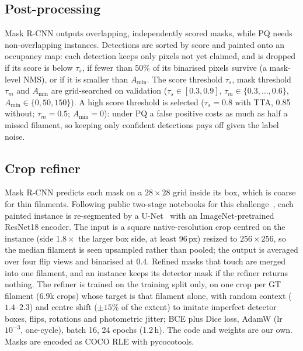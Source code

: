 \subsection{Post-processing}
Mask R-CNN outputs overlapping, independently scored masks, while PQ needs non-overlapping
instances. Detections are sorted by score and painted onto an occupancy map: each detection keeps
only pixels not yet claimed, and is dropped if its score is below $\tau_s$, if fewer than 50\% of
its binarised pixels survive (a mask-level NMS), or if it is smaller than $A_{\min}$. The score
threshold $\tau_s$, mask threshold $\tau_m$ and $A_{\min}$ are grid-searched on validation
($\tau_s\in[0.3,0.9]$, $\tau_m\in\{0.3,\dots,0.6\}$, $A_{\min}\in\{0,50,150\}$). A high score
threshold is selected ($\tau_s=0.8$ with TTA, 0.85 without; $\tau_m=0.5$; $A_{\min}=0$): under PQ a
false positive costs as much as half a missed filament, so keeping only confident detections pays
off given the label noise.

\subsection{Crop refiner}
Mask R-CNN predicts each mask on a $28\times28$ grid inside its box, which is coarse for thin
filaments. Following public two-stage notebooks for this challenge~\cite{refinernb}, each painted
instance is re-segmented by a U-Net~\cite{ronneberger2015unet} with an ImageNet-pretrained ResNet18
encoder. The input is a square native-resolution crop centred on the instance (side $1.8\times$ the
larger box side, at least 96\,px) resized to $256\times256$, so the median filament is seen
upsampled rather than pooled; the output is averaged over four flip views and binarised at 0.4.
Refined masks that touch are merged into one filament, and an instance keeps its detector mask if
the refiner returns nothing. The refiner is trained on the training split only, on one crop per
GT filament (6.9k crops) whose target is that filament alone, with random context ($1.4$--$2.3$)
and centre shift ($\pm15\%$ of the extent) to imitate imperfect detector boxes, flips, rotations
and photometric jitter; BCE plus Dice loss, AdamW (lr $10^{-3}$, one-cycle), batch 16, 24 epochs
(1.2\,h). The code and weights are our own. Masks are encoded as COCO RLE with pycocotools.

